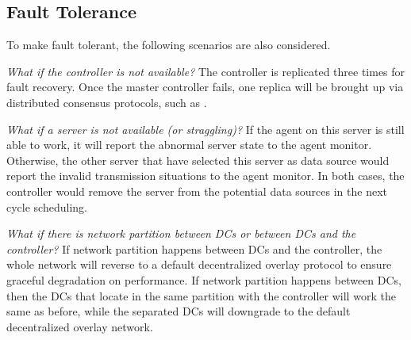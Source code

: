 

\subsection{Fault Tolerance}
\label{subsec:system:fault}
To make \name fault tolerant, the following scenarios are also considered.

\begin{packedenumerate}
\item \emph{What if the controller is not available?} The controller is replicated three times for fault recovery. Once the master controller fails, one replica will be brought up via distributed consensus protocols, such as \cite{lamport1998part}.
\item \emph{What if a server is not available (or straggling)?} If the agent on this server is still able to work, it will report the abnormal server state to the agent monitor. Otherwise, the other server that have selected this server as data source would report the invalid transmission situations to the agent monitor. In both cases, the controller would remove the server from the potential data sources in the next cycle scheduling.
\item \emph{What if there is network partition between DCs or between DCs and the controller?} If network partition happens between DCs and the controller, the whole network will reverse to a default decentralized overlay protocol to ensure graceful degradation on performance. If network partition happens between DCs, then the DCs that locate in the same partition with the controller will work the same as before, while the separated DCs will downgrade to the default decentralized overlay network.
\end{packedenumerate}
%
%
%
%
%



